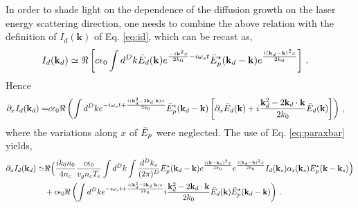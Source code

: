 \documentclass[
 reprint,
 amsmath,amssymb,
 aps,
]{revtex4-1}
\begin{document}
\begin{widetext}
In order to shade light on the dependence of the diffusion growth on the laser energy scattering direction, one needs to combine the above relation with the definition of $I_d(\mathbf{k})$ of  Eq. \eqref{eq:id}, which can be recast as,
\begin{align}
I_d(\mathbf{k}_d) &\simeq  \Re\left[  c\epsilon_0  \int d^Dk \Bar{E}_d(\mathbf{k})
e^{\frac{ -i\mathbf{k}^2x}{2k_0}-i\omega_s t}
\Bar{E}_p^\star(\mathbf{k}_d-\mathbf{k})
e^{\frac{ i(\mathbf{k}_d-\mathbf{k})^2x}{2k_0}} 
\right]  \, . \label{eq:idb} 
\end{align}
Hence
\begin{align}
\partial_xI_d(\mathbf{k}_d)=  &  c\epsilon_0  \Re\left( \int d^Dk e^{-i\omega_st+ \frac{i( \mathbf{k}_d^2-2\mathbf{k}_d\cdot \mathbf{k} )x}{2k_0}} \Bar{E}_p^\star(\mathbf{k}_d-\mathbf{k} )
\left[\partial_x \Bar{E}_d (\mathbf{k}  ) 
+i\frac{  \mathbf{k}_d^2-2\mathbf{k}_d\cdot \mathbf{k}}{2k_0} \Bar{E}_d(\mathbf{k})
\right]  \right)\, , \label{eq:idbdz}
\end{align}
where the variations along $x$ of $\Bar{E}_p$ were neglected. 
The  use of Eq. \eqref{eq:paraxbar} yields, 
\begin{align}
\partial_xI_d(\mathbf{k}_d)\simeq &\Re\Big( \frac{ik_0n_0}{4n_c} \frac{c\epsilon_0 }{  v_g n_c T_e}   \int d^Dk \int \frac{d^Dk_s}{(2\pi)^D} \Bar{E}_p^\star(\mathbf{k}_d-\mathbf{k})
e^{\frac{i(\mathbf{k}-\mathbf{k}_s)^2x}{2k_0} }
e^{\frac{i(\mathbf{k}_d-\mathbf{k})^2x}{2k_0} }
I_d(\mathbf{k}_s) \alpha_\mathrm{r}(\mathbf{k}_s) 
\Bar{E}_p^\star(\mathbf{k}-\mathbf{k}_s) 
 \Big) \nonumber\\
& +c\epsilon_0  \Re\left( \int d^Dk e^{-i\omega_s t+\frac{ i( \mathbf{k}_d^2-2\mathbf{k}_d\cdot \mathbf{k} )x}{2k_0}} 
i\frac{  \mathbf{k}_d^2-2\mathbf{k}_d\cdot \mathbf{k}}{2k_0} \Bar{E}_d(\mathbf{k})\Bar{E}_p^\star(\mathbf{k}_d-\mathbf{k} )
  \right)
\, . \label{eq:g1}
\end{align}

\end{widetext}
\end{document}
